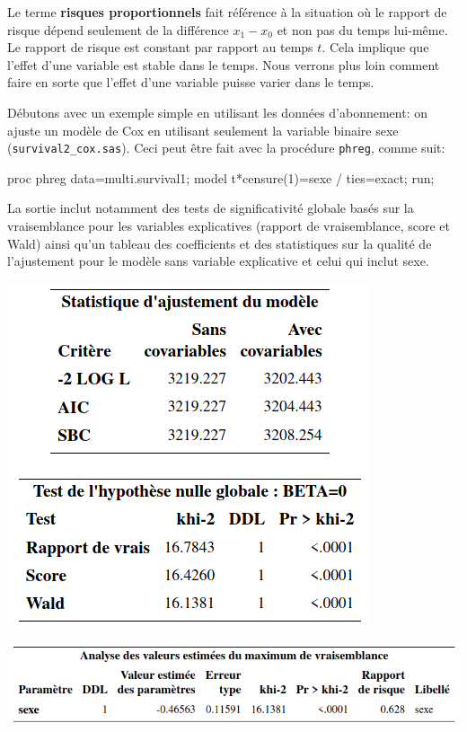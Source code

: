 \documentclass[
  11pt,
  letterpaper,
]{book}
\newenvironment{Shaded}{\begin{snugshade}}{\end{snugshade}}
\newcommand{\NormalTok}[1]{#1}
\theoremstyle{definition}
\theoremstyle{definition}
\theoremstyle{definition}
\theoremstyle{definition}
\theoremstyle{remark}
\begin{document}
Le terme \textbf{risques proportionnels} fait référence à la situation où le rapport de risque dépend seulement de la différence \(x_1-x_0\) et non pas du temps lui-même. Le rapport de risque est constant par rapport au temps \(t\). Cela implique que l'effet d'une variable est stable dans le temps. Nous verrons plus loin comment faire en sorte que l'effet d'une variable puisse varier dans le temps.

Débutons avec un exemple simple en utilisant les données d'abonnement: on ajuste un modèle de Cox en utilisant seulement la variable binaire sexe (\texttt{survival2\_cox.sas}). Ceci peut être fait avec la procédure \texttt{phreg}, comme suit:

\begin{Shaded}
\begin{Highlighting}[]
\NormalTok{proc phreg data=multi.survival1;}
\NormalTok{model t*censure(1)=sexe / ties=exact; }
\NormalTok{run;}
\end{Highlighting}
\end{Shaded}

La sortie inclut notamment des tests de significativité globale basés sur la vraisemblance pour les variables explicatives (rapport de vraisemblance, score et Wald) ainsi qu'un tableau des coefficients et des statistiques sur la qualité de l'ajustement pour le modèle sans variable explicative et celui qui inclut sexe.

\begin{center}\includegraphics[width=0.45\linewidth]{figures/05-survie-e11} \end{center}

\begin{center}\includegraphics[width=0.85\linewidth]{figures/05-survie-e12} \end{center}
\end{document}
